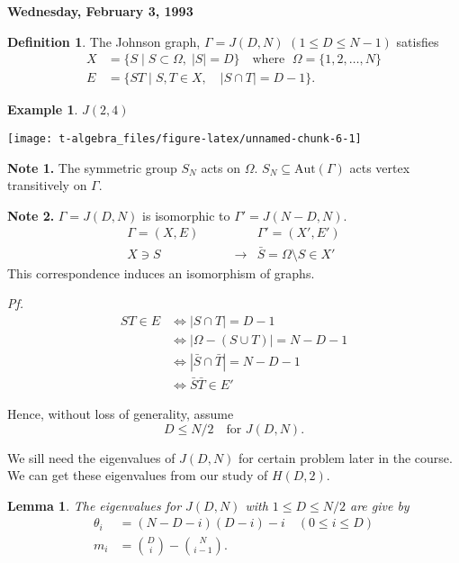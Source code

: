 \documentclass[
]{book}
\newtheorem{lemma}{Lemma}[chapter]
\theoremstyle{definition}
\newtheorem{definition}{Definition}[chapter]
\theoremstyle{definition}
\newtheorem{example}{Example}[chapter]
\theoremstyle{definition}
\theoremstyle{definition}
\theoremstyle{remark}
\begin{document}
\textbf{Wednesday, February 3, 1993}

\begin{definition}
The Johnson graph, \(\Gamma = J(D,N)\) \((1\leq D\leq N-1)\) satisfies
\begin{align}
X & = \{S\mid S\subset \Omega, \; |S| = D\} \quad\text{where }\; \Omega = \{1, 2, \ldots, N\}\\
E & = \{ST\mid S, T\in X, \quad |S\cap T| = D-1\}.
\end{align}
\end{definition}

\begin{example}

\(J(2,4)\)

\begin{center}\texttt{[image: t-algebra\_files/figure-latex/unnamed-chunk-6-1]} \end{center}

\end{example}

\textbf{Note 1.}
The symmetric group \(S_N\) acts on \(\Omega\). \(S_N \subseteq \mathrm{Aut}(\Gamma)\) acts vertex transitively on \(\Gamma\).

\textbf{Note 2.}
\(\Gamma = J(D,N)\) is isomorphic to \(\Gamma' = J(N-D,N)\).
\begin{align}
\Gamma = (X, E) & & \Gamma' = (X', E')\\
X\ni S & \qquad \longrightarrow & \bar{S} = \Omega\setminus S \in X'
\end{align}
This correspondence induces an isomorphism of graphs.

\emph{Pf.}
\begin{align}
ST\in E & \Leftrightarrow  |S\cap T| = D-1\\
  & \Leftrightarrow  |\Omega - (S\cup T)| = N-D-1\\
  & \Leftrightarrow  |\bar{S} \cap \bar{T}| = N-D-1\\
  & \Leftrightarrow  \bar{S}\bar{T} \in E'
\end{align}

Hence, without loss of generality, assume
\[D\leq N/2 \quad \text{for } J(D,N).\]

We sill need the eigenvalues of \(J(D,N)\) for certain problem later in the course. We can get these eigenvalues from our study of \(H(D,2)\).

\begin{lemma}
The eigenvalues for \(J(D,N)\) with \(1\leq D \leq N/2\) are give by
\begin{align}
\theta_i & = (N-D-i)(D-i) - i \quad (0\leq i\leq D)\\
m_i & = \binom{D}{i} - \binom{N}{i-1}.
\end{align}
\end{lemma}
\end{document}
